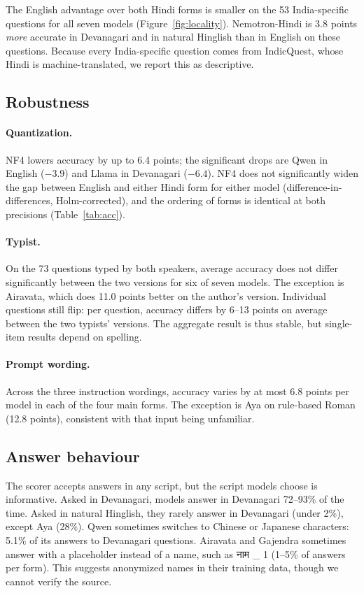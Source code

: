 \documentclass[11pt]{article}
\newcommand{\hi}[1]{{\devfont #1}}
\newcommand{\Dev}{Devanagari}
\newcommand{\Rom}{rule-based Roman}
\newcommand{\Hng}{natural Hinglish}
\begin{document}
The English advantage over both Hindi forms is smaller on the 53 India-specific questions for all seven models (Figure~\ref{fig:locality}).
Nemotron-Hindi is 3.8 points \emph{more} accurate in \Dev{} and in \Hng{} than in English on these questions.
Because every India-specific question comes from IndicQuest, whose Hindi is machine-translated, we report this as descriptive.

\subsection{Robustness}

\paragraph{Quantization.}
NF4 lowers accuracy by up to 6.4 points; the significant drops are Qwen in English ($-3.9$) and Llama in \Dev{} ($-6.4$).
NF4 does not significantly widen the gap between English and either Hindi form for either model (difference-in-differences, Holm-corrected), and the ordering of forms is identical at both precisions (Table~\ref{tab:acc}).

\paragraph{Typist.}
On the 73 questions typed by both speakers, average accuracy does not differ significantly between the two versions for six of seven models.
The exception is Airavata, which does 11.0 points better on the author's version.
Individual questions still flip: per question, accuracy differs by 6--13 points on average between the two typists' versions.
The aggregate result is thus stable, but single-item results depend on spelling.

\paragraph{Prompt wording.}
Across the three instruction wordings, accuracy varies by at most 6.8 points per model in each of the four main forms.
The exception is Aya on \Rom{} (12.8 points), consistent with that input being unfamiliar.

\subsection{Answer behaviour}
The scorer accepts answers in any script, but the script models choose is informative.
Asked in \Dev{}, models answer in Devanagari 72--93\% of the time.
Asked in \Hng{}, they rarely answer in Devanagari (under 2\%), except Aya (28\%).
Qwen sometimes switches to Chinese or Japanese characters: 5.1\% of its answers to \Dev{} questions.
Airavata and Gajendra sometimes answer with a placeholder instead of a name, such as \hi{नाम} \_ 1 (1--5\% of answers per form).
This suggests anonymized names in their training data, though we cannot verify the source.
\end{document}
